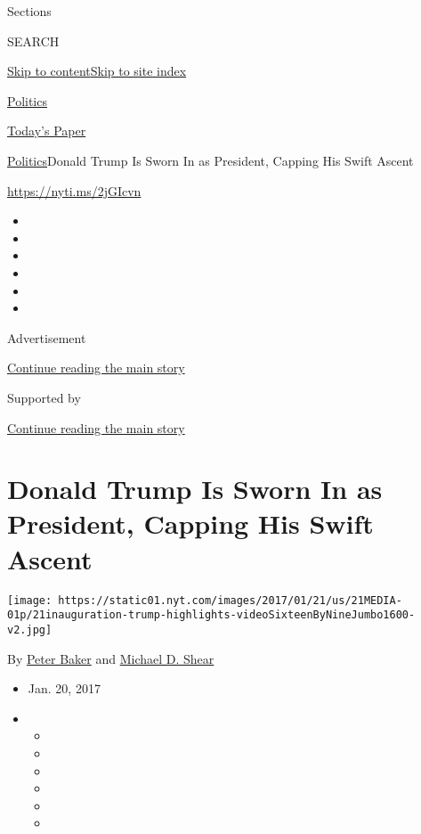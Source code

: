 Sections

SEARCH

\protect\hyperlink{site-content}{Skip to
content}\protect\hyperlink{site-index}{Skip to site index}

\href{https://www.nytimes.com/section/politics}{Politics}

\href{https://myaccount.nytimes.com/auth/login?response_type=cookie\&client_id=vi}{}

\href{https://www.nytimes.com/section/todayspaper}{Today's Paper}

\href{/section/politics}{Politics}\textbar{}Donald Trump Is Sworn In as
President, Capping His Swift Ascent

\url{https://nyti.ms/2jGIcvn}

\begin{itemize}
\item
\item
\item
\item
\item
\item
\end{itemize}

Advertisement

\protect\hyperlink{after-top}{Continue reading the main story}

Supported by

\protect\hyperlink{after-sponsor}{Continue reading the main story}

\hypertarget{donald-trump-is-sworn-in-as-president-capping-his-swift-ascent}{%
\section{Donald Trump Is Sworn In as President, Capping His Swift
Ascent}\label{donald-trump-is-sworn-in-as-president-capping-his-swift-ascent}}

\texttt{[image: https://static01.nyt.com/images/2017/01/21/us/21MEDIA-01p/21inauguration-trump-highlights-videoSixteenByNineJumbo1600-v2.jpg]}

By \href{http://www.nytimes.com/by/peter-baker}{Peter Baker} and
\href{http://www.nytimes.com/by/michael-d-shear}{Michael D. Shear}

\begin{itemize}
\item
  Jan. 20, 2017
\item
  \begin{itemize}
  \item
  \item
  \item
  \item
  \item
  \item
  \end{itemize}
\end{itemize}

